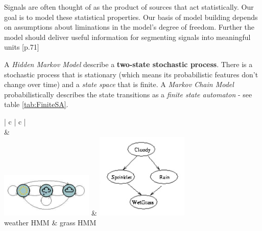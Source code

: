 

Signals are often thought of as the product of sources that act statistically.
Our goal is to model these statistical properties. Our basis of model building depends on 
assumptions about liminations in the model's degree of freedom. 
Further the model should deliver useful information for segmenting signals into meaningful units
\cite{mm_pr}[p.71]

A \emph{Hidden Markov Model} describe a \textbf{two-state stochastic process}.
There is a stochastic process that is stationary (which means its probabilistic features don't change over time) and a \emph{state space} that is finite.
A \emph{Markov Chain Model} probabilistically describes the state transitions as a \emph{finite state automaton} - see table \ref{tab:FiniteSA}.

\begin{table}[h]
	\begin{center}
		\begin{tabular}{| c | c |}
			\hline
			 \\
			\hline
			& \\
			\includegraphics[width=0.33\textwidth]{./Images/FiniteStateAutomaton_1.png} & \includegraphics[width=0.33\textwidth]{./Images/FiniteStateAutomaton_2.png} \\
			\hline
			weather HMM \cite{hmm_fb} & grass HMM \cite{gm_bn} \\
			\hline
		\end{tabular}
	\end{center}
	\caption{Two finite state automatons that describe the state space of two different HMMs. Nodes correspond to states and edges to transition probabilites betwenn states that are bigger than $0$.}
	\label{tab:FiniteSA}
\end{table}

